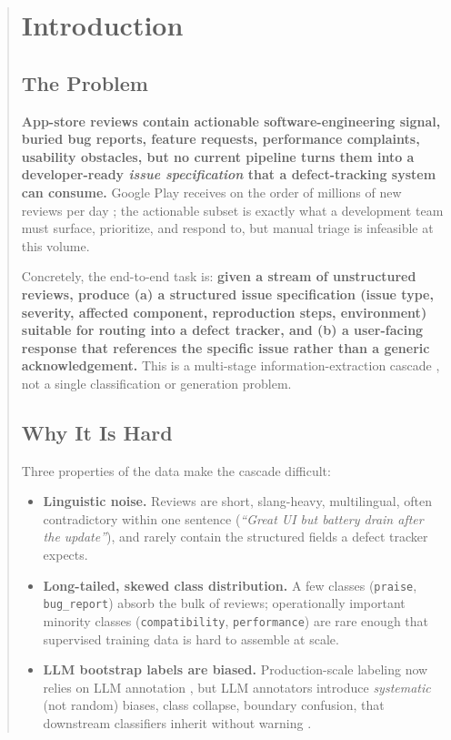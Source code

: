 \documentclass[sigconf, nonacm, anonymous, balance=false]{acmart}
\providecommand{\tightlist}{\setlength{\itemsep}{0pt}\setlength{\parskip}{0pt}}
\begin{document}
\begin{abstract}
\section{Introduction}\label{introduction}

\subsection{The Problem}\label{the-problem}

\textbf{App-store reviews contain actionable software-engineering signal, buried bug reports, feature requests, performance complaints, usability obstacles, but no current pipeline turns them into a developer-ready \emph{issue specification} that a defect-tracking system can consume.} Google Play receives on the order of millions of new reviews per day \cite{maalej2016, gao2019rrgen, dabrowski2022analysing}; the actionable subset is exactly what a development team must surface, prioritize, and respond to, but manual triage is infeasible at this volume.

Concretely, the end-to-end task is: \textbf{given a stream of unstructured reviews, produce (a) a structured issue specification (issue type, severity, affected component, reproduction steps, environment) suitable for routing into a defect tracker, and (b) a user-facing response that references the specific issue rather than a generic acknowledgement.} This is a multi-stage information-extraction cascade \cite{hearst1999, sarawagi2008}, not a single classification or generation problem.

\subsection{Why It Is Hard}\label{why-it-is-hard}

Three properties of the data make the cascade difficult:

\begin{itemize}
\tightlist
\item
  \textbf{Linguistic noise.} Reviews are short, slang-heavy, multilingual, often contradictory within one sentence (\emph{``Great UI but battery drain after the update''}), and rarely contain the structured fields a defect tracker expects.
\item
  \textbf{Long-tailed, skewed class distribution.} A few classes (\texttt{praise}, \texttt{bug\_report}) absorb the bulk of reviews; operationally important minority classes (\texttt{compatibility}, \texttt{performance}) are rare enough that supervised training data is hard to assemble at scale.
\item
  \textbf{LLM bootstrap labels are biased.} Production-scale labeling now relies on LLM annotation \cite{wang2021want, gilardi2023chatgpt}, but LLM annotators introduce \emph{systematic} (not random) biases, class collapse, boundary confusion, that downstream classifiers inherit without warning \cite{pangakis2023automated, reiss2023testing, laban2023llm}.
\end{itemize}


\end{abstract}
\end{document}
